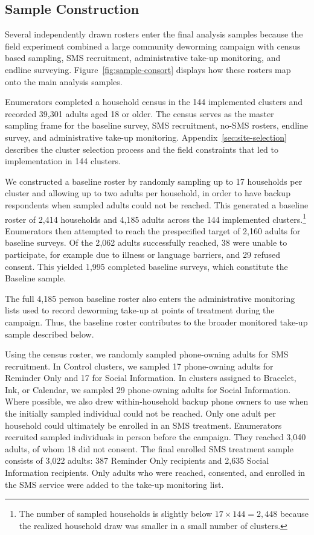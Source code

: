 \documentclass[ECM\space ReStud.tex]{subfiles}
\begin{document}
\subsection{Sample Construction}
\label{app:sample-construction}

Several independently drawn rosters enter the final analysis samples because the field experiment combined a large community deworming campaign with census based sampling, SMS recruitment, administrative take-up monitoring, and endline surveying. Figure~\ref{fig:sample-consort} displays how these rosters map onto the main analysis samples.

Enumerators completed a household census in the 144 implemented clusters and recorded 39{,}301 adults aged 18 or older. The census serves as the master sampling frame for the baseline survey, SMS recruitment, no-SMS rosters, endline survey, and administrative take-up monitoring. Appendix~\ref{sec:site-selection} describes the cluster selection process and the field constraints that led to implementation in 144 clusters.

We constructed a baseline roster by randomly sampling up to 17 households per cluster and allowing up to two adults per household, in order to have backup respondents when sampled adults could not be reached. This generated a baseline roster of 2{,}414 households and 4{,}185 adults across the 144 implemented clusters.\footnote{The number of sampled households is slightly below \(17 \times 144 = 2{,}448\) because the realized household draw was smaller in a small number of clusters.} Enumerators then attempted to reach the prespecified target of 2{,}160 adults for baseline surveys. Of the 2{,}062 adults successfully reached, 38 were unable to participate, for example due to illness or language barriers, and 29 refused consent. This yielded 1{,}995 completed baseline surveys, which constitute the Baseline sample.

The full 4{,}185 person baseline roster also enters the administrative monitoring lists used to record deworming take-up at points of treatment during the campaign. Thus, the baseline roster contributes to the broader monitored take-up sample described below.

Using the census roster, we randomly sampled phone-owning adults for SMS recruitment. In Control clusters, we sampled 17 phone-owning adults for Reminder Only and 17 for Social Information. In clusters assigned to Bracelet, Ink, or Calendar, we sampled 29 phone-owning adults for Social Information. Where possible, we also drew within-household backup phone owners to use when the initially sampled individual could not be reached. Only one adult per household could ultimately be enrolled in an SMS treatment. Enumerators recruited sampled individuals in person before the campaign. They reached 3{,}040 adults, of whom 18 did not consent. The final enrolled SMS treatment sample consists of 3{,}022 adults: 387 Reminder Only recipients and 2{,}635 Social Information recipients. Only adults who were reached, consented, and enrolled in the SMS service were added to the take-up monitoring list.
\end{document}
